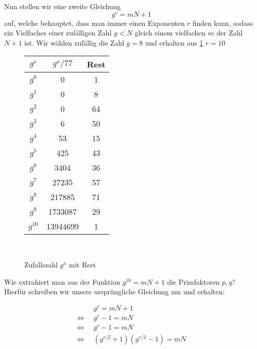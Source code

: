 Nun stellen wir eine zweite Gleichung 
$${g^r = mN+1}$$ 
auf, welche behauptet, dass man immer einen Exponenten $r$ finden kann, sodass ein Vielfaches einer zufälligen Zahl $g < N$ gleich einem vielfachen $m$ der Zahl $N+1$ ist.
Wir wählen zufällig die Zahl $g = 8$ und erhalten aus \ref{fig:Zufallszahl $g^x$ mit Rest} $r = 10$

\begin{figure}[h]
    \begin{center}
        \begin{tabular}{|c|c|c|} \hline
            $g^x$       &   $g^x/77$    &   Rest    \\\hline
            $g^0$       &   0           &   1       \\\hline
            $g^1$       &   0           &   8       \\\hline
            $g^2$       &   0           &   64      \\\hline
            $g^3$       &   6           &   50      \\\hline
            $g^4$       &   53          &   15      \\\hline
            $g^5$       &   425         &   43      \\\hline
            $g^6$       &   3404        &   36      \\\hline
            $g^7$       &   27235       &   57      \\\hline
            $g^8$       &   217885      &   71      \\\hline
            $g^9$       &   1733087     &   29      \\\hline
            $g^{10}$    &   13944699    &   1       \\\hline
        \end{tabular}\\
    \end{center}
    \caption{Zufallszahl $g^x$ mit Rest}
    \label{fig:Zufallszahl $g^x$ mit Rest}
\end{figure}

Wie extrahiert man aus der Funktion $g^{10} = mN + 1$ die Primfaktoren $p, q$? Hierfür schreiben wir unsere ursprüngliche Gleichung um und erhalten:

\begin{align*}
                        &   g^r = mN+1      \\
    \Leftrightarrow\;\; &   g^r - 1 = mN    \\
    \Leftrightarrow\;\; &   g^r - 1 = mN    \\
    \Leftrightarrow\;\; &   (g^{r/2} + 1)(g^{r/2} - 1) = mN
\end{align*}

